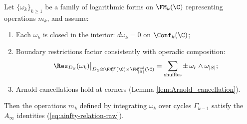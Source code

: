 \begin{theorem}
\label{thm:stokes_arnold}
Let $\{\omega_k\}_{k \geq 1}$ be a family of logarithmic forms on $\FM_k(\C)$ representing operations $m_k$, and assume:
\begin{enumerate}[label=(\roman*)]
\item Each $\omega_k$ is closed in the interior: $d\omega_k = 0$ on $\Conf_k(\C)$;
\item Boundary restrictions factor consistently with operadic composition:
\[
\Res_{D_S}(\omega_k)\big|_{D_S \cong
\FM_r^{\mathrm{tr}}(\C)\times\FM_{|S|}^{\mathrm{red}}(\C)}
= \sum_{\text{shuffles}} \pm \, \omega_r \wedge \omega_{|S|};
\]
\item Arnold cancellations hold at corners (Lemma \ref{lem:Arnold_cancellation}).
\end{enumerate}
Then the operations $m_k$ defined by integrating $\omega_k$ over cycles $\Gamma_{k-1}$ satisfy the $A_\infty$ identities (\ref{eq:ainfty-relation-raw}).
\end{theorem}

